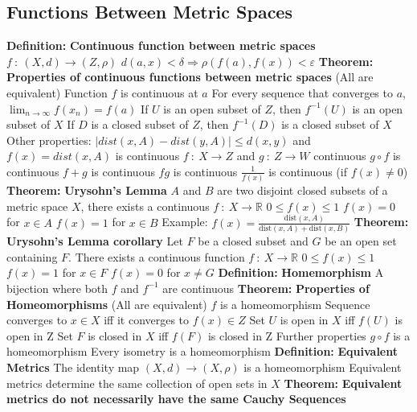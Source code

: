 \documentclass[14pt]{extarticle}
\def\Definition{{\color{Blue} \textbf{Definition:} }}
\def\Theorem{{\color{Red} \textbf{Theorem:} }}
\begin{document}
\begin{outline}
		\section{Functions Between Metric Spaces}
		\1	\Definition \textbf{Continuous function between metric spaces}
			\2	$f~:~(X,d) \rightarrow (Z,\rho)$
			\2	$d(a,x) < \delta \Rightarrow \rho(f(a),f(x)) < \varepsilon$
		\1	\Theorem	\textbf{Properties of continuous functions between metric spaces} (All are equivalent)
			\2	Function $f$ is continuous at $a$ 
			\2	For every sequence that converges
					to $a$, $\lim_{n\rightarrow \infty}f(x_n) = f(a)$
			\2	If $U$ is an open subset of $Z$, then $f^{-1}(U)$ is an open subset of $X$
			\2	If $D$ is a closed subset of $Z$, then $f^{-1}(D)$ is a closed subset of $X$
			\2	Other properties:
				\3	$|dist(x,A) - dist(y,A)| \le d(x,y)$ and $f(x) = dist(x,A)$ is continuous
				\3	$f~:~X \rightarrow Z$ and $g~:~Z \rightarrow W$ continuous
					\4	$g \circ f$ is continuous
					\4	$f + g$ is continuous
					\4	$fg$ is continuous
					\4	$\frac{1}{f(x)}$ is continuous (if $f(x) \ne 0$)	
		\1	\Theorem	\textbf{Urysohn's Lemma}
			\2	$A$ and $B$ are two disjoint closed subsets of a metric space $X$, 
					there exists a continuous $f~:~X \rightarrow \mathbb{R}$
			\2	$0 \le f(x) \le 1$
			\2	$f(x) = 0$ for $x \in A$
			\2	$f(x) = 1$ for $x \in B$
			\2	Example: $f(x) = \frac{\text{dist}(x,A)}
					{\text{dist}(x,A) + \text{dist}(x,B)}$
		\1	\Theorem \textbf{Urysohn's Lemma corollary}
			\2	Let $F$ be a closed subset and $G$ be an open set containing $F$.  
					There exists a continuous function $f~:~X \rightarrow \mathbb{R}$
			\2	$0 \le f(x) \le 1$
			\2	$f(x) = 1$ for $x \in F$
			\2	$f(x) = 0$ for $x \ne G$
		\1	\Definition \textbf{Homemorphism}
			\2	A bijection where both $f$ and $f^{-1}$ are continuous
		\1	\Theorem	\textbf{Properties of Homeomorphisms} (All are equivalent)
			\2	$f$ is a homeomorphism
			\2	Sequence converges to $x \in X$ iff it converges to $f(x) \in Z$
			\2	Set $U$ is open in $X$ iff $f(U)$ is open in Z
			\2	Set $F$ is closed in $X$ iff $f(F)$ is closed in Z
			\2	Further properties
				\3	$g \circ f$ is a homeomorphism
				\3	Every isometry is a homeomorphism
		\1	\Definition \textbf{Equivalent Metrics}
			\2	The identity map $(X,d) \rightarrow (X,\rho)$ is a homeomorphism
			\2	Equivalent metrics determine the same collection of open sets in $X$
		\1	\Theorem \textbf{Equivalent metrics do not necessarily have the same Cauchy Sequences}

\end{outline}
\end{document}
